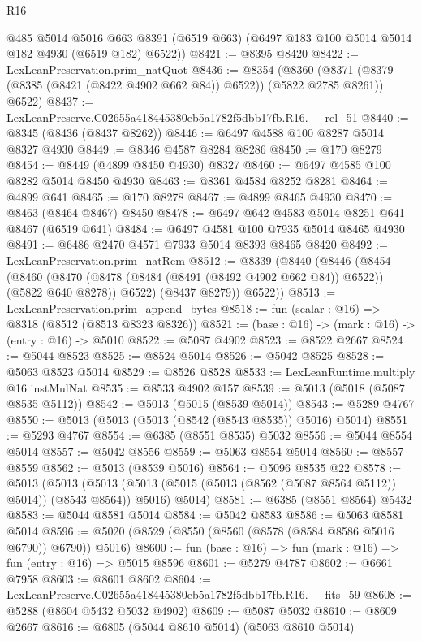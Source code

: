 \begin{lexlean}{R16}
\begin{coremodule}
      @485
      @5014
      @5016
      @663
      @8391
      (@6519 @663)
      (@6497 @183 @100 @5014 @5014 @182 @4930 (@6519 @182) @6522))
@8421 := @8395 @8420
@8422 := LexLeanPreservation.prim_natQuot
@8436 := @8354
    (@8360 (@8371 (@8379 (@8385 (@8421 (@8422 @4902 @662 @84)) @6522)) (@5822 @2785 @8261)) @6522)
@8437 := LexLeanPreserve.C02655a418445380eb5a1782f5dbb17fb.R16.__rel_51
@8440 := @8345 (@8436 (@8437 @8262))
@8446 := @6497 @4588 @100 @8287 @5014 @8327 @4930
@8449 := @8346 @4587 @8284 @8286
@8450 := @170 @8279
@8454 := @8449 (@4899 @8450 @4930) @8327
@8460 := @6497 @4585 @100 @8282 @5014 @8450 @4930
@8463 := @8361 @4584 @8252 @8281
@8464 := @4899 @641
@8465 := @170 @8278
@8467 := @4899 @8465 @4930
@8470 := @8463 (@8464 @8467) @8450
@8478 := @6497 @642 @4583 @5014 @8251 @641 @8467 (@6519 @641)
@8484 := @6497 @4581 @100 @7935 @5014 @8465 @4930
@8491 := @6486 @2470 @4571 @7933 @5014 @8393 @8465 @8420
@8492 := LexLeanPreservation.prim_natRem
@8512 := @8339
    (@8440
      (@8446
        (@8454
          (@8460
            (@8470 (@8478 (@8484 (@8491 (@8492 @4902 @662 @84)) @6522)) (@5822 @640 @8278))
            @6522)
          (@8437 @8279))
        @6522))
@8513 := LexLeanPreservation.prim_append_bytes
@8518 := fun (scalar : @16) => @8318 (@8512 (@8513 @8323 @8326))
@8521 := (base : @16) -> (mark : @16) -> (entry : @16) -> @5010
@8522 := @5087 @4902
@8523 := @8522 @2667
@8524 := @5044 @8523
@8525 := @8524 @5014
@8526 := @5042 @8525
@8528 := @5063 @8523 @5014
@8529 := @8526 @8528
@8533 := LexLeanRuntime.multiply @16 instMulNat
@8535 := @8533 @4902 @157
@8539 := @5013 (@5018 (@5087 @8535 @5112))
@8542 := @5013 (@5015 (@8539 @5014))
@8543 := @5289 @4767
@8550 := @5013 (@5013 (@5013 (@8542 (@8543 @8535)) @5016) @5014)
@8551 := @5293 @4767
@8554 := @6385 (@8551 @8535) @5032
@8556 := @5044 @8554 @5014
@8557 := @5042 @8556
@8559 := @5063 @8554 @5014
@8560 := @8557 @8559
@8562 := @5013 (@8539 @5016)
@8564 := @5096 @8535 @22
@8578 := @5013
    (@5013
      (@5013 (@5013 (@5015 (@5013 (@8562 (@5087 @8564 @5112)) @5014)) (@8543 @8564)) @5016)
      @5014)
@8581 := @6385 (@8551 @8564) @5432
@8583 := @5044 @8581 @5014
@8584 := @5042 @8583
@8586 := @5063 @8581 @5014
@8596 := @5020 (@8529 (@8550 (@8560 (@8578 (@8584 @8586 @5016 @6790)) @6790)) @5016)
@8600 := fun (base : @16) => fun (mark : @16) => fun (entry : @16) => @5015 @8596
@8601 := @5279 @4787
@8602 := @6661 @7958
@8603 := @8601 @8602
@8604 := LexLeanPreserve.C02655a418445380eb5a1782f5dbb17fb.R16.__fits_59
@8608 := @5288 (@8604 @5432 @5032 @4902)
@8609 := @5087 @5032
@8610 := @8609 @2667
@8616 := @6805 (@5044 @8610 @5014) (@5063 @8610 @5014)

\end{coremodule}
\end{lexlean}
